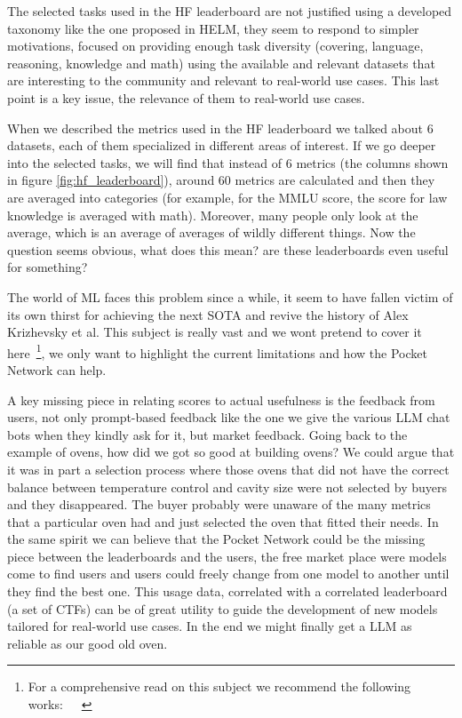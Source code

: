 The selected tasks used in the \gls{HF} leaderboard are not justified using a developed taxonomy like the one proposed in \gls{HELM}, they seem to respond to simpler motivations, focused on providing enough task diversity (covering, language, reasoning, knowledge and math) using the available and relevant datasets that are interesting to the community and relevant to real-world use cases. This last point is a key issue, the relevance of them to real-world use cases.

When we described the metrics used in the \gls{HF} leaderboard we talked about 6 datasets, each of them specialized in different areas of interest. If we go deeper into the selected tasks, we will find that instead of 6 metrics (the columns shown in figure \ref{fig:hf_leaderboard}), around 60 metrics are calculated and then they are averaged into categories (for example, for the MMLU score, the score for law knowledge is averaged with math). Moreover, many people only look at the average, which is an average of averages of wildly different things. 
Now the question seems obvious, what does this mean? are these leaderboards even useful for something?

The world of \gls{ML} faces this problem since a while, it seem to have fallen victim of its own thirst for achieving the next \gls{SOTA} and revive the history of Alex Krizhevsky et al. This subject is really vast and we wont pretend to cover it here~\footnote{For a comprehensive read on this subject we recommend the following works:~\cite{nityasya2023scientific}~\cite{chollet2019measure}~\cite{raji2021ai}}, we only want to highlight the current limitations and how the Pocket Network can help.

A key missing piece in relating scores to actual usefulness is the feedback from users, not only prompt-based feedback like the one we give the various \gls{LLM} chat bots when they kindly ask for it, but market feedback. Going back to the example of ovens, how did we got so good at building ovens? We could argue that it was in part a selection process where those ovens that did not have the correct balance between temperature control and cavity size were not selected by buyers and they disappeared. The buyer probably were unaware of the many metrics that a particular oven had and just selected the oven that fitted their needs. In the same spirit we can believe that the Pocket Network could be the missing piece between the leaderboards and the users, the free market place were models come to find users and users could freely change from one model to another until they find the best one. This usage data, correlated with a correlated leaderboard (a set of \gls{CTF}s) can be of great utility to guide the development of new models tailored for real-world use cases. In the end we might finally get a \gls{LLM} as reliable as our good old oven.